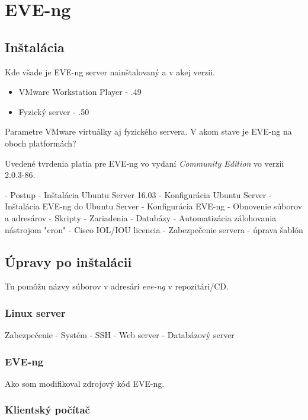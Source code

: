 \chapter{EVE-ng}

\section{Inštalácia}

Kde všade je EVE-ng server nainštalovaný a v akej verzii.

\begin{itemize}
    \item VMware Workstation Player - .49
    \item Fyzický server - .50
\end{itemize}

Parametre VMware virtuálky aj fyzického servera. V akom stave je EVE-ng na oboch platformách?

Uvedené tvrdenia platia pre EVE-ng vo vydaní \emph{Community Edition} vo verzii 2.0.3-86.

  - Postup
    - Inštalácia Ubuntu Server 16.03
    - Konfigurácia Ubuntu Server
    - Inštalácia EVE-ng do Ubuntu Server
    - Konfigurácia EVE-ng
      - Obnovenie súborov a adresárov
        - Skripty
        - Zariadenia
        - Databázy
      - Automatizácia zálohovania nástrojom "cron"
      - Cisco IOL/IOU licencia
      - Zabezpečenie servera
  - úprava šablón

\section{Úpravy po inštalácii}

Tu pomôžu názvy súborov v adresári \emph{eve-ng} v repozitári/CD.

\subsection{Linux server}
    Zabezpečenie
  - Systém
  - SSH
  - Web server
  - Databázový server
  
\subsection{EVE-ng}

Ako som modifikoval zdrojový kód EVE-ng.

\subsection{Klientský počítač}

